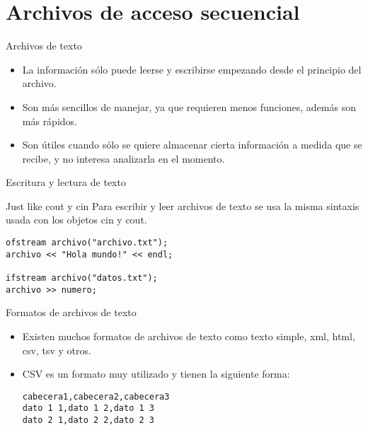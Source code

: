 \documentclass[aspectratio=169]{beamer}
\begin{document}
\section{Archivos de acceso secuencial}
\begin{frame}{Archivos de texto}
\begin{itemize}
\item La información sólo puede leerse y escribirse empezando desde el principio del archivo.
\item Son más sencillos de manejar, ya que requieren menos funciones, además son más rápidos.
\item Son útiles cuando sólo se quiere almacenar cierta información a medida que se recibe, y no interesa analizarla en el momento.
\end{itemize}
\end{frame}

\begin{frame}[fragile]{Escritura y lectura de texto}
\begin{block}{Just like cout y cin}
Para escribir y leer archivos de texto se usa la misma sintaxis usada con
los objetos cin y cout.
\end{block}
\begin{lstlisting}
ofstream archivo("archivo.txt");
archivo << "Hola mundo!" << endl;

ifstream archivo("datos.txt");
archivo >> numero;
\end{lstlisting}
\end{frame}

\begin{frame}[fragile]{Formatos de archivos de texto}
\begin{itemize}
\item Existen muchos formatos de archivos de texto como texto simple, xml, html, csv, tsv y otros.
\item CSV es un formato muy utilizado y tienen la siguiente forma:
\begin{lstlisting}
cabecera1,cabecera2,cabecera3
dato 1 1,dato 1 2,dato 1 3
dato 2 1,dato 2 2,dato 2 3
\end{lstlisting}
\end{itemize}
\end{frame}

\end{document}

